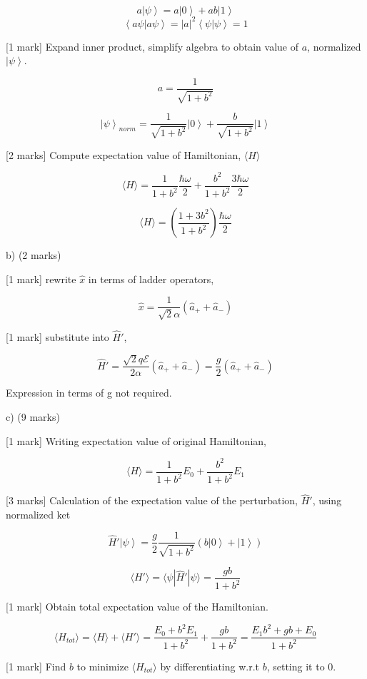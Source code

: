 \[ a \left| \psi \right> = a\left| 0 \right> + ab \left| 1 \right> \]
\[ \left< a\psi | a\psi \right> = |a|^2 \left< \psi | \psi \right> = 1 \]

[1 mark] Expand inner product, simplify algebra to obtain value of \( a \), normalized \( \left| \psi \right> \).

\[ a = \frac{1}{\sqrt{1+b^2}} \]

\[ \left| \psi \right>_{norm} = \frac{1}{\sqrt{1+b^2}} \left| 0 \right> + \frac{b}{\sqrt{1+b^2}} \left| 1 \right> \]

[2 marks] Compute expectation value of Hamiltonian, \( \langle H \rangle \) 

\[ \langle H \rangle = \frac{1}{1+b^2} \frac{\hbar \omega}{2} + \frac{b^2}{1+b^2} \frac{3\hbar \omega}{2} \]

\[ \langle H \rangle = \left ( \frac{1+3b^2}{1+b^2} \right) \frac{\hbar \omega}{2} \]

b) (2 marks)

[1 mark] rewrite \( \hat{x} \) in terms of ladder operators,

\[ \hat{x} = \frac{1}{\sqrt{2} \alpha} (\hat{a}_{+} + \hat{a}_{-}) \]

[1 mark] substitute into \( \hat{H}' \), 

\[ \hat{H}' = \frac{\sqrt{2} q \mathcal{E}}{2 \alpha} (\hat{a}_{+} + \hat{a}_{-}) = \frac{g}{2} (\hat{a}_{+} + \hat{a}_{-}) \]

Expression in terms of g not required. 

c) (9 marks)

[1 mark] Writing expectation value of original Hamiltonian, 

\[ \langle H \rangle = \frac{1}{1+b^2} E_0 + \frac{b^2}{1+b^2} E_1 \]

[3 marks] Calculation of the expectation value of the perturbation, \( \hat{H}' \), using normalized ket

\[ \hat{H}' \left| \psi \right> = \frac{g}{2} \frac{1}{\sqrt{1+b^2}} (b \left| 0 \right> + \left| 1 \right> ) \]

\[ \langle H' \rangle = \langle \psi | \hat{H}' | \psi \rangle = \frac{gb}{1+b^2}\]

[1 mark] Obtain total expectation value of the Hamiltonian. 

\[ \langle H_{tot} \rangle = \langle H \rangle + \langle H' \rangle = \frac{E_0+b^2E_1}{1+b^2} + \frac{gb}{1+b^2} = \frac{E_1 b^2 + gb + E_0}{1+b^2} \]

[1 mark] Find \( b \) to minimize \( \langle H_{tot} \rangle \) by differentiating w.r.t \( b \), setting it to 0. 

